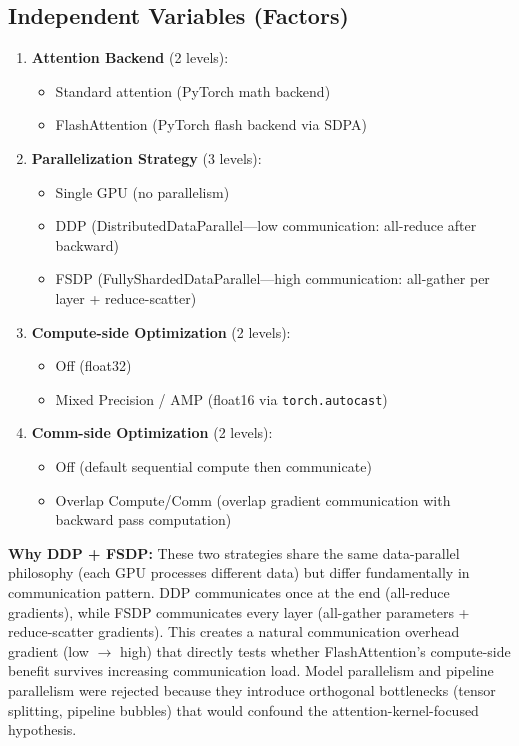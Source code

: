 \documentclass[12pt, a4paper]{article}
\begin{document}
\subsection{Independent Variables (Factors)}

\begin{enumerate}
    \item \textbf{Attention Backend} (2 levels):
    \begin{itemize}
        \item Standard attention (PyTorch math backend)
        \item FlashAttention (PyTorch flash backend via SDPA)
    \end{itemize}

    \item \textbf{Parallelization Strategy} (3 levels):
    \begin{itemize}
        \item Single GPU (no parallelism)
        \item DDP (DistributedDataParallel---low communication: all-reduce after backward)
        \item FSDP (FullyShardedDataParallel---high communication: all-gather per layer + reduce-scatter)
    \end{itemize}

    \item \textbf{Compute-side Optimization} (2 levels):
    \begin{itemize}
        \item Off (float32)
        \item Mixed Precision / AMP (float16 via \texttt{torch.autocast})
    \end{itemize}

    \item \textbf{Comm-side Optimization} (2 levels):
    \begin{itemize}
        \item Off (default sequential compute then communicate)
        \item Overlap Compute/Comm (overlap gradient communication with backward pass computation)
    \end{itemize}
\end{enumerate}

\vspace{1em}
\textbf{Why DDP + FSDP:}
These two strategies share the same data-parallel philosophy (each GPU processes different data) but differ fundamentally in communication pattern. DDP communicates once at the end (all-reduce gradients), while FSDP communicates every layer (all-gather parameters + reduce-scatter gradients). This creates a natural communication overhead gradient (low $\rightarrow$ high) that directly tests whether FlashAttention's compute-side benefit survives increasing communication load. Model parallelism and pipeline parallelism were rejected because they introduce orthogonal bottlenecks (tensor splitting, pipeline bubbles) that would confound the attention-kernel-focused hypothesis.
\end{document}
